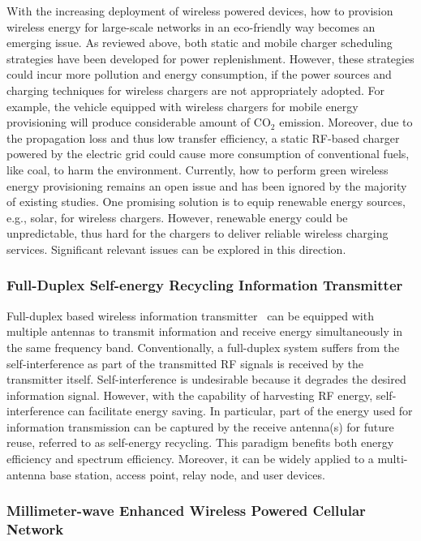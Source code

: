 \documentclass[twocolumn,10pt]{IEEEtran}
\begin{document}
With the increasing deployment of wireless powered devices, how to provision wireless energy for large-scale networks in an eco-friendly way becomes an emerging issue. As reviewed above, both static and mobile charger scheduling strategies have been developed for power replenishment. However, these strategies could incur more pollution and energy consumption, if the power sources and charging techniques for wireless chargers are not appropriately adopted. For example, the vehicle equipped with wireless chargers for mobile energy provisioning will produce considerable amount of CO$_{2}$ emission. Moreover, due to the propagation loss and thus low transfer efficiency, a static RF-based charger powered by the electric grid could cause more consumption of conventional fuels, like coal, to harm the environment.  
Currently, how to perform green wireless energy provisioning remains an open issue and has been ignored by the majority of existing studies.
One promising solution is to equip renewable energy sources, e.g., solar, for wireless chargers. However, renewable energy could be unpredictable, thus hard for the chargers to deliver reliable wireless charging services. Significant relevant issues can be explored in this direction.



\subsubsection{Full-Duplex Self-energy Recycling Information Transmitter}

Full-duplex based wireless information transmitter~\cite{Y.2015Zeng} can be equipped with multiple antennas to transmit information and receive energy simultaneously in the same frequency band. Conventionally, a full-duplex system suffers from the self-interference as part of the transmitted RF signals is received by the transmitter itself. Self-interference is undesirable because it degrades the desired information signal. However, with the capability of harvesting RF energy, self-interference can facilitate energy saving. In particular, part of the energy used for information transmission can be captured by the receive antenna(s) for future reuse, referred to as self-energy recycling. This paradigm benefits both energy efficiency and spectrum efficiency. Moreover, it can be widely applied to a multi-antenna base station, access point, relay node, and user devices.   

\subsubsection{Millimeter-wave Enhanced Wireless Powered Cellular Network}
\end{document}

